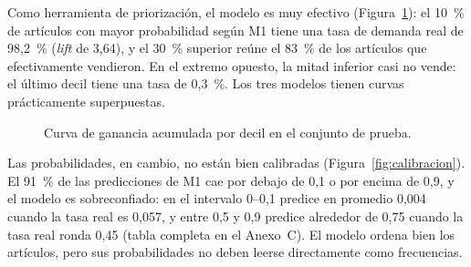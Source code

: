 \documentclass[
  journal=largetwo,
  manuscript=Laboratorio-Numero-02,
  year=2026,
  volume=1
]{cup-journal}
\newcommand{\datos}[1]{fig/data/#1}
\begin{document}
Como herramienta de priorización, el modelo es muy efectivo (Figura~\ref{fig:ganancia}): el 10~\% de artículos con mayor probabilidad según M1 tiene una tasa de demanda real de 98,2~\% (\textit{lift} de 3,64), y el 30~\% superior reúne el 83~\% de los artículos que efectivamente vendieron. En el extremo opuesto, la mitad inferior casi no vende: el último decil tiene una tasa de 0,3~\%. Los tres modelos tienen curvas prácticamente superpuestas.

\begin{figure}[!ht]
\centering
{}
\caption{Curva de ganancia acumulada por decil en el conjunto de prueba.}
\label{fig:ganancia}
\end{figure}

Las probabilidades, en cambio, no están bien calibradas (Figura~\ref{fig:calibracion}). El 91~\% de las predicciones de M1 cae por debajo de 0,1 o por encima de 0,9, y el modelo es sobreconfiado: en el intervalo 0--0,1 predice en promedio 0,004 cuando la tasa real es 0,057, y entre 0,5 y 0,9 predice alrededor de 0,75 cuando la tasa real ronda 0,45 (tabla completa en el Anexo~C). El modelo ordena bien los artículos, pero sus probabilidades no deben leerse directamente como frecuencias.
\end{document}
